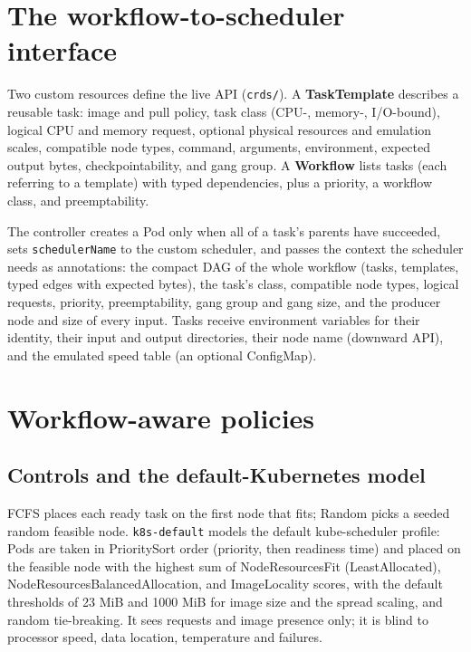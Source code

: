 \documentclass[12pt,a4paper]{report}
\newcommand{\pol}[1]{\texttt{#1}}
\begin{document}
\section{The workflow-to-scheduler interface}

Two custom resources define the live API (\texttt{crds/}).
A \textbf{TaskTemplate} describes a reusable task: image and pull policy,
task class (CPU-, memory-, I/O-bound), logical CPU and memory request,
optional physical resources and emulation scales, compatible node types,
command, arguments, environment, expected output bytes, checkpointability,
and gang group. A \textbf{Workflow} lists tasks (each referring to a
template) with typed dependencies, plus a priority, a workflow class, and
preemptability.

The controller creates a Pod only when all of a task's parents have
succeeded, sets \texttt{schedulerName} to the custom scheduler, and passes
the context the scheduler needs as annotations: the compact DAG of the
whole workflow (tasks, templates, typed edges with expected bytes), the
task's class, compatible node types, logical requests, priority,
preemptability, gang group and gang size, and the producer node and size
of every input. Tasks receive environment variables for their identity,
their input and output directories, their node name (downward API), and
the emulated speed table (an optional ConfigMap).

\section{Workflow-aware policies}
\label{sec:policies}

\subsection{Controls and the default-Kubernetes model}

FCFS places each ready task on the first node that fits; Random picks a
seeded random feasible node. \pol{k8s-default} models the default
kube-scheduler profile: Pods are taken in PrioritySort order (priority,
then readiness time) and placed on the feasible node with the highest sum
of NodeResourcesFit (LeastAllocated), NodeResourcesBalancedAllocation, and
ImageLocality scores, with the default thresholds of 23 MiB and 1000 MiB
for image size and the spread scaling, and random tie-breaking. It sees
requests and image presence only; it is blind to processor speed, data
location, temperature and failures.
\end{document}
